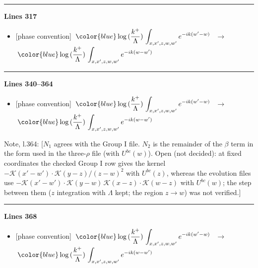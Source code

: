 \documentclass[10pt]{article}
\newenvironment{notebox}{\def\FrameCommand{{\color{notebar}\vrule width 1.5pt}\hspace{6pt}}\MakeFramed{\advance\hsize-\width\FrameRestore}\small}{\endMakeFramed}
\begin{document}
\noindent\rule{\linewidth}{0.3pt}\par\noindent\textbf{Lines 317} \par
\begin{itemize}[leftmargin=2.2em,itemsep=1pt,topsep=2pt]
\item[\textbf{l.317}] \textsf{\small [phase convention]} $\displaystyle \,{\color{blue}\log{(\frac{k^{+}}{\Lambda})}}\,\int_{x,x',z,w,w'}e^{-ik(w'-w)}\,$\ $\longrightarrow$\ $\displaystyle \,{\color{blue}\log{(\frac{k^{+}}{\Lambda})}}\,\int_{x,x',z,w,w'}e^{-ik(w-w')}\,$
\end{itemize}
\noindent\rule{\linewidth}{0.3pt}\par\noindent\textbf{Lines 340--364} \par
\begin{itemize}[leftmargin=2.2em,itemsep=1pt,topsep=2pt]
\item[\textbf{l.340}] \textsf{\small [phase convention]} $\displaystyle \,{\color{blue}\log{(\frac{k^{+}}{\Lambda})}}\,\int_{x,x',z,w,w'}e^{-ik(w'-w)}\,$\ $\longrightarrow$\ $\displaystyle \,{\color{blue}\log{(\frac{k^{+}}{\Lambda})}}\,\int_{x,x',z,w,w'}e^{-ik(w-w')}\,$
\end{itemize}
\begin{notebox}\textsf{\small Note, l.364:} [$N_{1}$ agrees with the Group I file. $N_{2}$ is the remainder of the $\beta$ term in the form used in the three-$\rho$ file (with $U^{bc}(w)$). Open (not decided): at fixed coordinates the checked Group I row gives the kernel $-\mathcal{K}(x'-w')\cdot\mathcal{K}(y-z)/(z-w)^{2}$ with $U^{bc}(z)$, whereas the evolution files use $-\mathcal{K}(x'-w')\cdot\mathcal{K}(y-w)\,\mathcal{K}(x-z)\cdot\mathcal{K}(w-z)$ with $U^{bc}(w)$; the step between them ($z$ integration with $\Lambda$ kept; the region $z\to w$) was not verified.]\end{notebox}
\noindent\rule{\linewidth}{0.3pt}\par\noindent\textbf{Lines 368} \par
\begin{itemize}[leftmargin=2.2em,itemsep=1pt,topsep=2pt]
\item[\textbf{l.368}] \textsf{\small [phase convention]} $\displaystyle \,{\color{blue}\log{(\frac{k^{+}}{\Lambda})}}\,\int_{x,x',z,w,w'}e^{-ik(w'-w)}\,$\ $\longrightarrow$\ $\displaystyle \,{\color{blue}\log{(\frac{k^{+}}{\Lambda})}}\,\int_{x,x',z,w,w'}e^{-ik(w-w')}\,$
\end{itemize}
\end{document}
